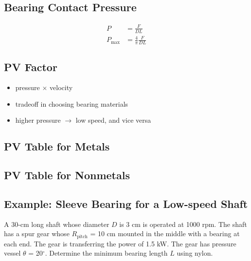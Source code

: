 \documentclass[
10pt,
a4paper,
openany,
svgnames,
]{book}
\begin{document}
\subsection*{Bearing Contact Pressure}
\label{sec:orgfbd15a0}

\begin{align*}
    P &= \frac{F}{DL} \\
    P_{\max} &= \frac{4}{\pi} \frac{F}{DL}
 \end{align*}

\subsection*{PV Factor}
\label{sec:org3e1ac8b}

\begin{itemize}
\item pressure \(\times\) velocity
\item tradeoff in choosing bearing materials
\item higher pressure \(\rightarrow\) low speed, and vice versa
\end{itemize}

\subsection*{PV Table for Metals}
\label{sec:orgb26b2cd}

\begin{center}
\end{center}

\subsection*{PV Table for Nonmetals}
\label{sec:org7bf1135}

\begin{center}
\end{center}

\subsection*{Example: Sleeve Bearing for a Low-speed Shaft}
\label{sec:org45b86ce}

A 30-cm long shaft whose diameter \(D\) is 3 cm is operated at 1000 rpm. The shaft has a spur gear whose \(R_{\text{pitch}}\) = 10 cm mounted in the middle with a bearing at each end. The gear is transferring the power of 1.5 kW. The gear has pressure vessel \(\theta\) = 20\(^{\circ}\). Determine the minimum bearing length \(L\) using nylon.
\end{document}
